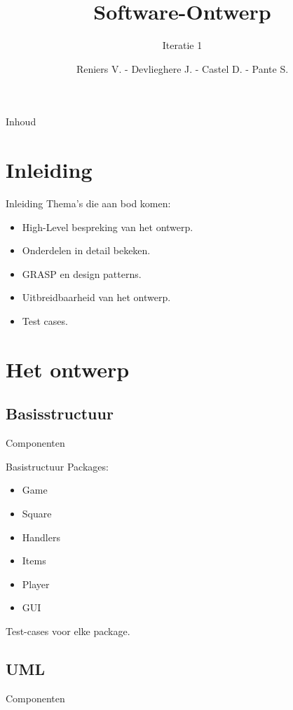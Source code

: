 \documentclass[t]{beamer}
\title{Software-Ontwerp}
\subtitle{Iteratie 1}
\author{Reniers V. - Devlieghere J. - Castel D. - Pante S.}
\institute{KU Leuven}
\begin{document}
\frame{\titlepage} 
\begin{frame}{Inhoud}
\begin{multicols}{2}
\tableofcontents
\end{multicols}
\end{frame}



\section{Inleiding} 
\begin{frame}{Inleiding} 
Thema's die aan bod komen:
\begin{itemize}
	\item High-Level bespreking van het ontwerp.
	\item Onderdelen in detail bekeken.
	\item GRASP en design patterns.
	\item Uitbreidbaarheid van het ontwerp.
	\item Test cases.
\end{itemize}
\end{frame}

\section{Het ontwerp}
\subsection{Basisstructuur}
\begin{frame}{Componenten}
\begin{multicols}{2}
\tableofcontents[currentsection]
\end{multicols}
\end{frame}

\begin{frame}{Basistructuur}
Packages:
\begin{itemize}
	\item Game
	\item Square
	\item Handlers
	\item Items
	\item Player
	\item GUI
\end{itemize}
Test-cases voor elke package.
\end{frame}


\subsection{UML}
\begin{frame}{Componenten}
\begin{multicols}{2}
\tableofcontents[currentsection]
\end{multicols}
\end{frame}
\end{document}
